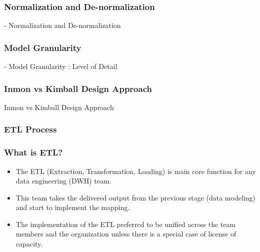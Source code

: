 
\begin{frame}
    \frametitle{Normalization and De-normalization}

    - Normalization and De-normalization\\
\end{frame}


\begin{frame}
    \frametitle{Model Granularity}

    - Model Granularity : Level of Detail\\
\end{frame}



\begin{frame}
    \frametitle{Inmon vs Kimball Design Approach }

    Inmon vs Kimball Design Approach

\end{frame}

\subsubsection{ETL Process}

\begin{frame}
    \frametitle{What is ETL?}

    \begin{itemize}[<+->]
        \item The ETL (Extraction, Transformation, Loading) is main core function for any data engineering (DWH) team.
        \item This team takes the delivered output from the previous stage (data modeling) and start to implement the mapping.
        \item The implementation of the ETL preferred to be unified across the team members and the organization unless there is a special case of license of capacity.

    \end{itemize}


\end{frame}

